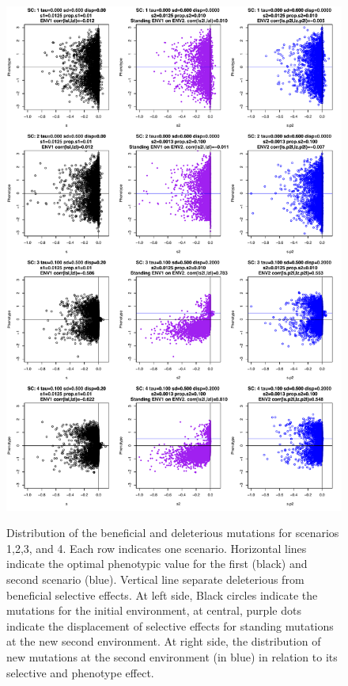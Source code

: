 \documentclass[a4paper,11pt]{article}
\begin{document}
\begin{figure}[h]
{\includegraphics[scale=0.45]{./Dist_ALLScenarios1.pdf}}
\caption{Distribution of the beneficial and deleterious mutations for scenarios 1,2,3, and 4. Each row indicates one scenario. Horizontal lines indicate the optimal phenotypic value for the first (black) and second scenario (blue). Vertical line separate deleterious from beneficial selective effects. At left side, Black circles indicate the mutations for the initial environment, at central, purple dots indicate the displacement of selective effects for standing mutations at the new second environment.  At right side, the distribution of new mutations at the second environment (in blue) in relation to its selective and phenotype effect.}
\label{DistALLScenarios1}
\hspace*{-0.5cm}
\end{figure}
\end{document}
